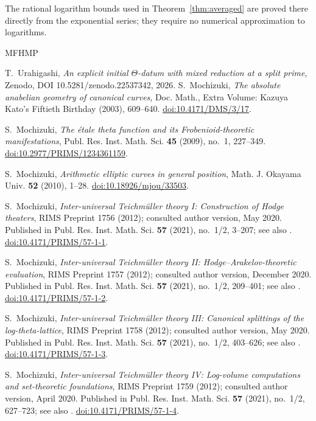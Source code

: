 \documentclass[11pt]{article}
\theoremstyle{plain}
\theoremstyle{definition}
\begin{document}
The rational logarithm bounds used in Theorem~\ref{thm:averaged} are
proved there directly from the exponential series; they require no numerical
approximation to logarithms.

\begin{thebibliography}{MFHMP}

 T.~Urahigashi, \emph{An explicit initial $\Theta$-datum with
 mixed reduction at a split prime}, Zenodo, DOI 10.5281/zenodo.22537342, 2026.
S.~Mochizuki,
\emph{The absolute anabelian geometry of canonical curves},
Doc. Math., Extra Volume: Kazuya Kato's Fiftieth Birthday (2003), 609--640.
\href{https://doi.org/10.4171/DMS/3/17}{doi:10.4171/DMS/3/17}.

S.~Mochizuki,
\emph{The \'etale theta function and its Frobenioid-theoretic manifestations},
Publ. Res. Inst. Math. Sci. \textbf{45} (2009), no.~1, 227--349.
\href{https://doi.org/10.2977/PRIMS/1234361159}{doi:10.2977/PRIMS/1234361159}.

S.~Mochizuki,
\emph{Arithmetic elliptic curves in general position},
Math. J. Okayama Univ. \textbf{52} (2010), 1--28.
\href{https://doi.org/10.18926/mjou/33503}{doi:10.18926/mjou/33503}.

S.~Mochizuki,
\emph{Inter-universal Teichm\"uller theory I: Construction of Hodge theaters},
RIMS Preprint 1756 (2012); consulted author version, May 2020.
Published in Publ. Res. Inst. Math. Sci. \textbf{57} (2021), no.~1/2, 3--207;
see also \cite{IUTpub}.
\href{https://doi.org/10.4171/PRIMS/57-1-1}{doi:10.4171/PRIMS/57-1-1}.

S.~Mochizuki,
\emph{Inter-universal Teichm\"uller theory II: Hodge--Arakelov-theoretic evaluation},
RIMS Preprint 1757 (2012); consulted author version, December 2020.
Published in Publ. Res. Inst. Math. Sci. \textbf{57} (2021), no.~1/2, 209--401;
see also \cite{IUTpub}.
\href{https://doi.org/10.4171/PRIMS/57-1-2}{doi:10.4171/PRIMS/57-1-2}.

S.~Mochizuki,
\emph{Inter-universal Teichm\"uller theory III: Canonical splittings of the log-theta-lattice},
RIMS Preprint 1758 (2012); consulted author version, May 2020.
Published in Publ. Res. Inst. Math. Sci. \textbf{57} (2021), no.~1/2, 403--626;
see also \cite{IUTpub}.
\href{https://doi.org/10.4171/PRIMS/57-1-3}{doi:10.4171/PRIMS/57-1-3}.

S.~Mochizuki,
\emph{Inter-universal Teichm\"uller theory IV: Log-volume computations and set-theoretic foundations},
RIMS Preprint 1759 (2012); consulted author version, April 2020.
Published in Publ. Res. Inst. Math. Sci. \textbf{57} (2021), no.~1/2, 627--723;
see also \cite{IUTpub}.
\href{https://doi.org/10.4171/PRIMS/57-1-4}{doi:10.4171/PRIMS/57-1-4}.


\end{thebibliography}
\end{document}
